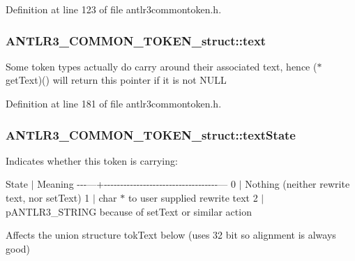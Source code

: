 Definition at line 123 of file antlr3commontoken.\-h.

\hypertarget{struct_a_n_t_l_r3___c_o_m_m_o_n___t_o_k_e_n__struct_acf3ae47f1cd3cdd62174e8617bcee521}{
\subsubsection[{text}]{ A\-N\-T\-L\-R3\-\_\-\-C\-O\-M\-M\-O\-N\-\_\-\-T\-O\-K\-E\-N\-\_\-struct\-::text}}\label{struct_a_n_t_l_r3___c_o_m_m_o_n___t_o_k_e_n__struct_acf3ae47f1cd3cdd62174e8617bcee521}
Some token types actually do carry around their associated text, hence ($\ast$get\-Text)() will return this pointer if it is not N\-U\-L\-L 

Definition at line 181 of file antlr3commontoken.\-h.

\hypertarget{struct_a_n_t_l_r3___c_o_m_m_o_n___t_o_k_e_n__struct_a29257aa48515be08e2de8f1e3f958df1}{
\subsubsection[{text\-State}]{ A\-N\-T\-L\-R3\-\_\-\-C\-O\-M\-M\-O\-N\-\_\-\-T\-O\-K\-E\-N\-\_\-struct\-::text\-State}}\label{struct_a_n_t_l_r3___c_o_m_m_o_n___t_o_k_e_n__struct_a29257aa48515be08e2de8f1e3f958df1}
Indicates whether this token is carrying\-:

State $\vert$ Meaning -\/-\/-\/---+-\/-\/-\/-\/-\/-\/-\/-\/-\/-\/-\/-\/-\/-\/-\/-\/-\/-\/-\/-\/-\/-\/-\/-\/-\/-\/-\/-\/-\/-\/-\/-\/-\/-\/-\/--- 0 $\vert$ Nothing (neither rewrite text, nor set\-Text) 1 $\vert$ char $\ast$ to user supplied rewrite text 2 $\vert$ p\-A\-N\-T\-L\-R3\-\_\-\-S\-T\-R\-I\-N\-G because of set\-Text or similar action

Affects the union structure tok\-Text below (uses 32 bit so alignment is always good) 

